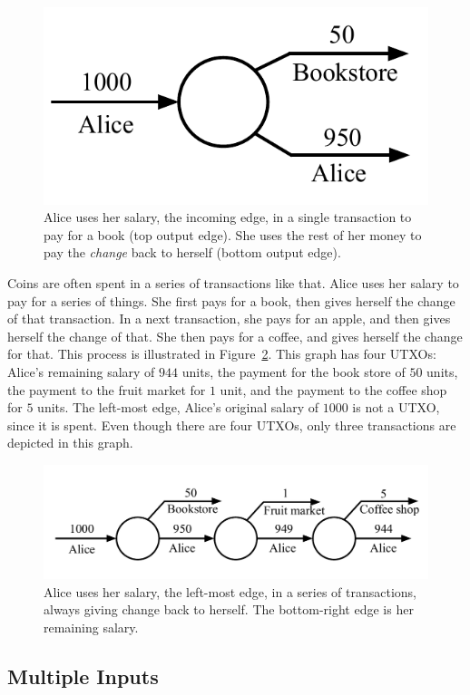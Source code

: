 \begin{figure}[h]
    \centering
    \includegraphics[width=0.35 \columnwidth,keepaspectratio]{figures/utxo-change.pdf}
    \caption{Alice uses her salary, the incoming edge, in a single transaction to pay for
             a book (top output edge). She uses the rest of her money to pay the
             \emph{change} back to herself (bottom output edge).}
    \label{fig.utxo-change}
\end{figure}

Coins are often spent in a series of transactions like that. Alice uses her salary
to pay for a series of things. She first pays for a book, then gives herself the change
of that transaction. In a next transaction, she pays for an apple, and then gives herself
the change of that. She then pays for a coffee, and gives herself the change for that.
This process is illustrated in Figure~\ref{fig.utxo-change-chain}. This graph has four
UTXOs: Alice's remaining salary of $944$ units, the payment for the book store of $50$
units, the payment to the fruit market for $1$ unit, and the payment to the coffee shop
for $5$ units. The left-most edge, Alice's original salary of $1000$ is not a UTXO, since
it is spent. Even though there are four UTXOs, only three transactions are depicted in this
graph.

\begin{figure}[h]
    \centering
    \includegraphics[width=0.75 \columnwidth,keepaspectratio]{figures/utxo-change-chain.pdf}
    \caption{Alice uses her salary, the left-most edge, in a series of transactions,
             always giving change back to herself. The bottom-right edge is her remaining salary.}
    \label{fig.utxo-change-chain}
\end{figure}

\subsection*{Multiple Inputs}

